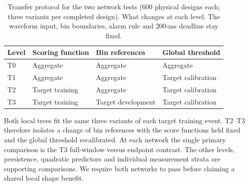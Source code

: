 \documentclass[10pt]{article}
\begin{document}
\begin{table}[ht]\centering\small
\caption{Transfer protocol for the two network tests (600 physical designs each; three variants per completed design). What changes at each level. The waveform input, bin boundaries, alarm rule and 200-ms deadline stay fixed.}\label{tab:levels}
\begin{tabular}{llll}\toprule Level & Scoring function & Bin references & Global threshold\\\midrule
T0 & Aggregate & Aggregate & Aggregate\\
T1 & Aggregate & Aggregate & Target calibration\\
T2 & Target training & Aggregate & Target calibration\\
T3 & Target training & Target development & Target calibration\\\bottomrule
\end{tabular}\end{table}
Both local trees fit the same three variants of each target training event. T2--T3 therefore isolates a change of bin references with the score functions held fixed and the global threshold recalibrated. At each network the single primary comparison is the T3 full-window versus endpoint contrast. The other levels, persistence, quadratic predictors and individual measurement strata are supporting comparisons. We require both networks to pass before claiming a shared local shape benefit.
\end{document}
